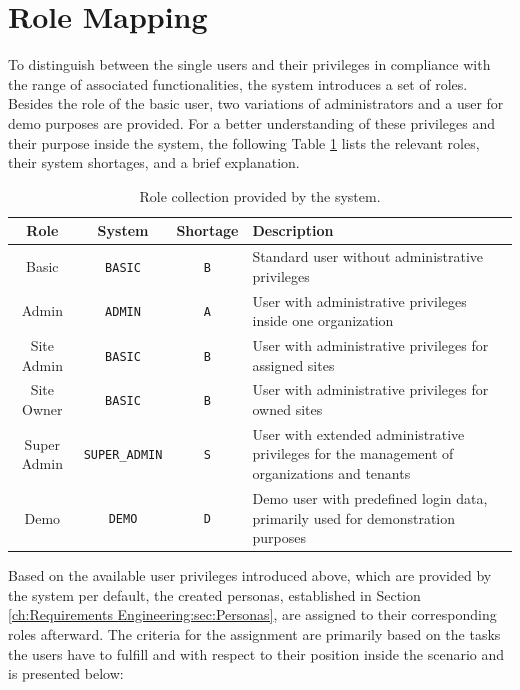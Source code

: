 \section{Role Mapping}
\label{ch:Requirements Engineering:sec:Role Mapping}

To distinguish between the single users and their privileges in compliance with the range of associated functionalities, the system introduces a set of roles. Besides the role of the basic user, two variations of administrators and a user for demo purposes are provided.
For a better understanding of these privileges and their purpose inside the system, the following Table \ref{tab:system-role-collection} lists the relevant roles, their system shortages, and a brief explanation.

\begingroup
\setlength{\tabcolsep}{10pt} %
\renewcommand{\arraystretch}{1.5} %
\begin{table}[h]
    \centering
    \caption{Role collection provided by the system.}
    \begin{tabular}{c|c|c|m{6cm}}
        Role & System & Shortage & Description \\
        \hline
        Basic & \verb|BASIC| & \verb|B| & Standard user without administrative privileges \\
        Admin & \verb|ADMIN| & \verb|A| & User with administrative privileges inside one organization \\
        Site Admin & \verb|BASIC| & \verb|B| & User with administrative privileges for assigned sites \\
        Site Owner & \verb|BASIC| & \verb|B| & User with administrative privileges for owned sites \\
        Super Admin & \verb|SUPER_ADMIN| & \verb|S| & User with extended administrative privileges for the management of organizations and tenants \\
        Demo & \verb|DEMO| & \verb|D| & Demo user with predefined login data, primarily used for demonstration purposes
    \end{tabular}
    \label{tab:system-role-collection}
\end{table}
\endgroup

\newpage

\noindent Based on the available user privileges introduced above, which are provided by the system per default, the created personas, established in Section \ref{ch:Requirements Engineering:sec:Personas}, are assigned to their corresponding roles afterward. The criteria for the assignment are primarily based on the tasks the users have to fulfill and with respect to their position inside the scenario and is presented below:

